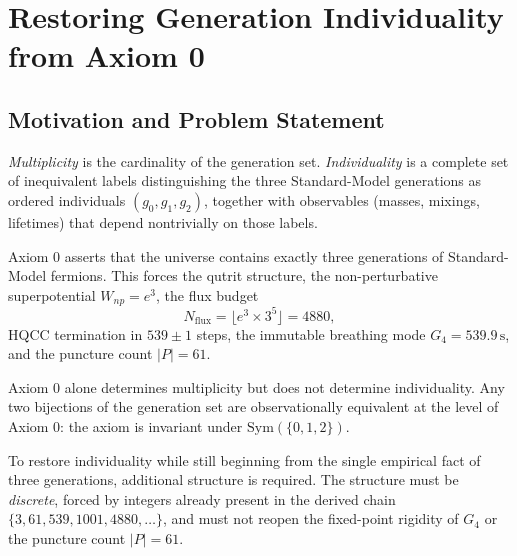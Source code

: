 
\chapter{Restoring Generation Individuality from Axiom 0}
\label{ch:individuality}

\section{Motivation and Problem Statement}

\begin{definition}
\emph{Multiplicity} is the cardinality of the generation set. \emph{Individuality}
is a complete set of inequivalent labels distinguishing the three Standard-Model
generations as ordered individuals \((g_0,g_1,g_2)\), together with observables
(masses, mixings, lifetimes) that depend nontrivially on those labels.
\end{definition}

\begin{lemma}
\label{lem:multiplicity}
Axiom 0 asserts that the universe contains exactly three generations of
Standard-Model fermions. This forces the qutrit structure, the non-perturbative
superpotential \(W_{np}=e^3\), the flux budget
\[
N_{\mathrm{flux}}=\lfloor e^3\times 3^5\rfloor=4880,
\]
HQCC termination in \(539\pm 1\) steps, the immutable breathing mode
\(G_4=539.9\,\mathrm{s}\), and the puncture count \(|P|=61\).
\end{lemma}

\begin{lemma}
\label{lem:gap}
Axiom 0 alone determines multiplicity but does not determine individuality.
Any two bijections of the generation set are observationally equivalent at the
level of Axiom 0: the axiom is invariant under \(\mathrm{Sym}(\{0,1,2\})\).
\end{lemma}

\begin{corollary}
To restore individuality while still beginning from the single empirical fact of
three generations, additional structure is required. The structure must be
\emph{discrete}, forced by integers already present in the derived chain
\(\{3,61,539,1001,4880,\ldots\}\), and must not reopen the fixed-point rigidity
of \(G_4\) or the puncture count \(|P|=61\).
\end{corollary}

